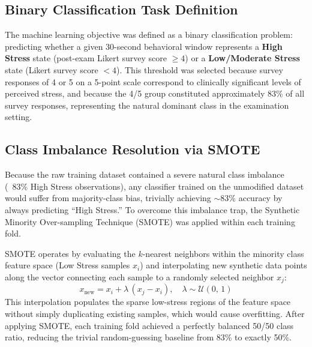 \subsection{Binary Classification Task Definition}
The machine learning objective was defined as a binary classification problem: predicting whether a given 30-second behavioral window represents a \textbf{High Stress} state (post-exam Likert survey score $\geq 4$) or a \textbf{Low/Moderate Stress} state (Likert survey score $< 4$). This threshold was selected because survey responses of 4 or 5 on a 5-point scale correspond to clinically significant levels of perceived stress, and because the 4/5 group constituted approximately 83\% of all survey responses, representing the natural dominant class in the examination setting.

\subsection{Class Imbalance Resolution via SMOTE}
Because the raw training dataset contained a severe natural class imbalance (~83\% High Stress observations), any classifier trained on the unmodified dataset would suffer from majority-class bias, trivially achieving $\sim$83\% accuracy by always predicting ``High Stress.'' To overcome this imbalance trap, the Synthetic Minority Over-sampling Technique (SMOTE) was applied within each training fold.

\noindent SMOTE operates by evaluating the $k$-nearest neighbors within the minority class feature space (Low Stress samples $x_i$) and interpolating new synthetic data points along the vector connecting each sample to a randomly selected neighbor $x_j$:
\begin{equation}
x_{\text{new}} = x_i + \lambda\,(x_j - x_i), \quad \lambda \sim \mathcal{U}(0,\,1)
\end{equation}
This interpolation populates the sparse low-stress regions of the feature space without simply duplicating existing samples, which would cause overfitting. After applying SMOTE, each training fold achieved a perfectly balanced 50/50 class ratio, reducing the trivial random-guessing baseline from 83\% to exactly 50\%.


